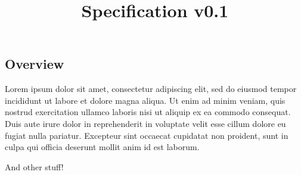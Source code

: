 \documentclass{myfuntestdoc}
\title{Specification v0.1}
\begin{document}
\frontmatter

\begin{titlepage}

  \section*{Overview}
  Lorem ipsum dolor sit amet, consectetur adipiscing elit, sed do
  eiusmod tempor incididunt ut labore et dolore magna aliqua. Ut enim
  ad minim veniam, quis nostrud exercitation ullamco laboris nisi ut
  aliquip ex ea commodo consequat. Duis aute irure dolor in
  reprehenderit in voluptate velit esse cillum dolore eu fugiat nulla
  pariatur. Excepteur sint occaecat cupidatat non proident, sunt in
  culpa qui officia deserunt mollit anim id est laborum.

  And other stuff!
\end{titlepage}

\tableofcontents
\listoftables
\listoffigures

\mainmatter


\end{document}
